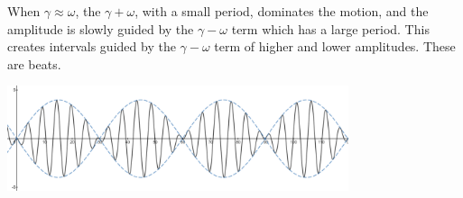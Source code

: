 \noindent
When $\gamma \approx \omega$, the $\gamma + \omega$, with a small period, dominates the motion, and the amplitude is slowly guided by the $\gamma - \omega$ term which has a large period. This creates intervals guided by the $\gamma - \omega$ term of higher and lower amplitudes. These are beats.

\begin{center}
	\includegraphics[width=0.75\textwidth]{./higherOrder/forcedVibrs/beats.png}
\end{center}